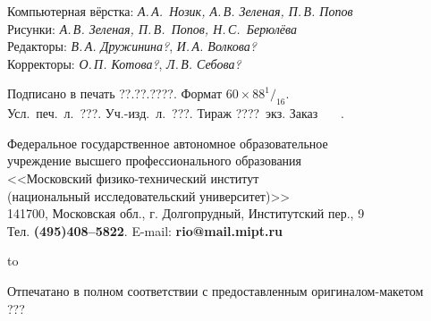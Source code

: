 {\footnotesize\raggedright

Компьютерная вёрстка: {\it А.\,А.~Нозик, А.\,В. Зеленая, П.\,В. Попов}\\
Рисунки: {\it А.\,В. Зеленая, П.\,В.~Попов, Н.\,С.~Берюлёва}\\
Редакторы: {\it В.\,А. Дружинина?}, {\it И.\,А. Волкова?}\\
Корректоры: {\it О.\,П. Котова?}, {\it Л.\,В. Себова?}

\bigskip

Подписано в печать ??.??.????. Формат $60\times88^1{/}_{16}$.\\
Усл.~печ.~л.~???. Уч.-изд.~л.~???. Тираж ????~экз. Заказ \textnumero~~~.

\bigskip

Федеральное государственное автономное образовательное\\
учреждение высшего профессионального образования\\
<<Московский физико-технический институт\\
(национальный исследовательский университет)>>\\
141700, Московская обл., г. Долгопрудный, Институтский пер., 9\\
Тел. {\bf (495)408--5822}. E-mail: {\bf rio@mail.mipt.ru}

\medskip

\hfil \hbox to \textwidth{\hrulefill}\par

Отпечатано в полном соответствии с предоставленным оригиналом-макетом\\
???


}

